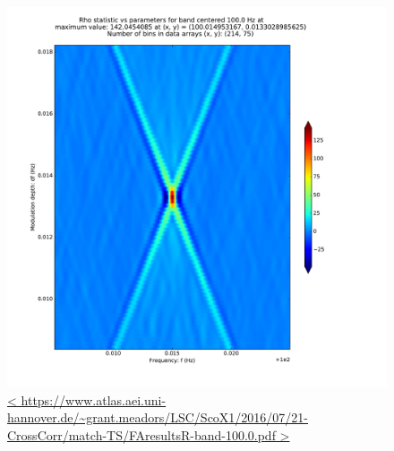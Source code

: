 \documentclass{article}
\begin{document}
\begin{figure}
\begin{center}
\includegraphics[trim= 0 0 0 0, clip, width=0.80\paperwidth,keepaspectratio]{plots/match-TS/FAresultsR-band-100-0.pdf}
\caption{
\url{<
https://www.atlas.aei.uni-hannover.de/~grant.meadors/LSC/ScoX1/2016/07/21-CrossCorr/match-TS/FAresultsR-band-100.0.pdf
>}
}
\label{FAcenterGraph}
\end{center}
\end{figure}
\end{document}
